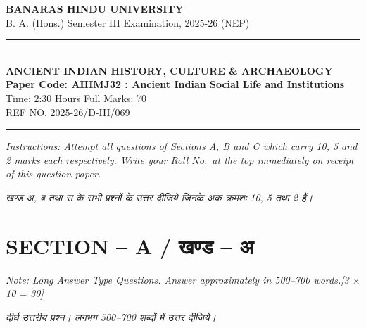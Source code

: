 \documentclass[11pt,a4paper]{article}
\newcommand{\pts}[1]{\hfill \textit{[#1]}}
\begin{document}
\begin{center}
  {\large\bfseries BANARAS HINDU UNIVERSITY}\\[2pt]
  {\normalsize B. A. (Hons.) Semester III Examination, 2025-26 (NEP)}\\[6pt]
  \rule{0.8\linewidth}{0.5pt}\\[6pt]
  {\large\bfseries ANCIENT INDIAN HISTORY, CULTURE \& ARCHAEOLOGY}\\[4pt]
  {\large\bfseries Paper Code: AIHMJ32 : Ancient Indian Social Life and Institutions}\\[4pt]
  {\normalsize Time: 2:30 Hours \hfill Full Marks: 70}\\[2pt]
  {\small REF NO. 2025-26/D-III/069}
\end{center}
\rule{\linewidth}{0.4pt}
\smallskip

\noindent \textit{Instructions: Attempt all questions of Sections A, B and C which carry 10, 5 and 2 marks each respectively. Write your Roll No.\ at the top immediately on receipt of this question paper.}

\smallskip
\noindent \textit{खण्ड अ, ब तथा स के सभी प्रश्नों के उत्तर दीजिये जिनके अंक क्रमशः 10, 5 तथा 2 हैं।}

\bigskip

\section*{SECTION -- A / खण्ड -- अ}
\noindent \textit{Note: Long Answer Type Questions. Answer approximately in 500--700 words.}\pts{3 $\times$ 10 = 30}

\noindent \textit{दीर्घ उत्तरीय प्रश्न। लगभग 500--700 शब्दों में उत्तर दीजिये।}
\end{document}
